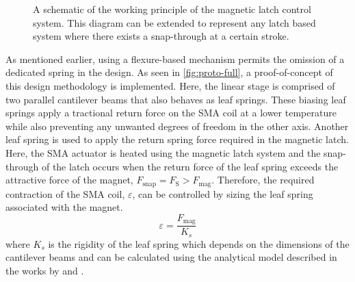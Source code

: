 \begin{figure}[hbt!] %
  \centering
  \resizebox{0.75\textwidth}{!}{}
  \caption[A schematic of the working principle of the magnetic latch control system]{A schematic of the working principle of the magnetic latch control system. This diagram can be extended to represent any latch based system where there exists a snap-through at a certain stroke.}
  \label{fig:latch-wp}
\end{figure}

As mentioned earlier, using a flexure-based mechanism permits the omission of a dedicated spring in the design. As seen in \cref{fig:proto-full}, a proof-of-concept of this design methodology is implemented. Here, the linear stage is comprised of two parallel cantilever beams that also behaves as leaf springs. These biasing leaf springs apply a tractional return force on the SMA coil at a lower temperature while also preventing any unwanted degrees of freedom in the other axis. Another leaf spring is used to apply the return spring force required in the magnetic latch. Here, the SMA actuator is heated using the magnetic latch system and the snap-through of the latch occurs when the return force of the leaf spring exceeds the attractive force of the magnet, $F_\mathrm{snap} = F_\textrm{S}>F_\textrm{mag}$. Therefore, the required contraction of the SMA coil, $\varepsilon$, can be controlled by sizing the leaf spring associated with the magnet.
\begin{equation}\label{eq:osc-stroke-sizing}
    \varepsilon = \frac{F_\textrm{mag}}{K_s}
\end{equation}
where $K_s$ is the rigidity of the leaf spring which depends on the dimensions of the cantilever beams and can be calculated using the analytical model described in the works by \cite{rubbertIsotropicSpringsBased2016} and \cite{heneinParallelSpringStages1998}.

